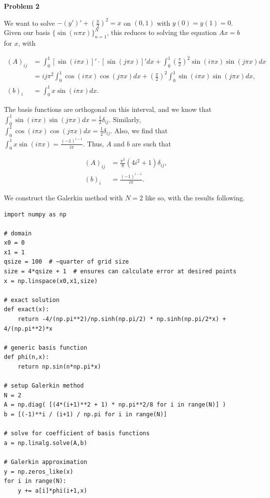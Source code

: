 \documentclass[12pt]{article}
\renewcommand{\d}{\delta}
\begin{document}
\newpage

\textbf{Problem 2}

We want to solve $-(y')' + (\frac{\pi}{2})^2 = x$ on $(0,1)$ with $y(0) = y(1) = 0$. Given our basis $\{\sin(n\pi x)\}_{n=1}^N$, this reduces to solving the equation $Ax = b$ for $x$, with 

\begin{align*}
(A)_{ij} &= \int_0^1 [\sin(i\pi x)]'\cdot[\sin(j\pi x)]'dx + \int_0^1 \left(\frac{\pi}{2}\right)^2 \sin(i\pi x) \sin(j\pi x) dx \\
&= ij\pi^2 \int_0^1 \cos(i\pi x) \cos(j\pi x)dx + \left(\frac{\pi}{2}\right)^2 \int_0^1 \sin(i\pi x) \sin(j\pi x) dx, \\
(b)_i &= \int_0^1 x\sin(i\pi x) dx.
\end{align*}

The basis functions are orthogonal on this interval, and we know that $\int_0^1 \sin(i\pi x) \sin(j\pi x) dx = \frac{1}{2} \d_{ij}$. Similarly, $\int_0^1 \cos(i\pi x) \cos(j\pi x) dx = \frac{1}{2} \d_{ij}$. Also, we find that $\int_0^1 x\sin(i\pi x) = \frac{(-1)^{i-1}}{i\pi}$. Thus, $A$ and $b$ are such that

\begin{align*}
(A)_{ij} &= \frac{\pi^2}{8}(4i^2 + 1)\d_{ij}, \\
(b)_i &= \frac{(-1)^{i-1}}{i\pi}.
\end{align*}

We construct the Galerkin method with $N=2$ like so, with the results following.

\begin{verbatim}
import numpy as np

# domain
x0 = 0
x1 = 1
qsize = 100  # ~quarter of grid size
size = 4*qsize + 1  # ensures can calculate error at desired points
x = np.linspace(x0,x1,size)

# exact solution
def exact(x):
    return -4/(np.pi**2)/np.sinh(np.pi/2) * np.sinh(np.pi/2*x) + 4/(np.pi**2)*x

# generic basis function
def phi(n,x):
    return np.sin(n*np.pi*x)

# setup Galerkin method
N = 2
A = np.diag( [(4*(i+1)**2 + 1) * np.pi**2/8 for i in range(N)] )
b = [(-1)**i / (i+1) / np.pi for i in range(N)]

# solve for coefficient of basis functions
a = np.linalg.solve(A,b)

# Galerkin approximation
y = np.zeros_like(x)
for i in range(N):
    y += a[i]*phi(i+1,x)
\end{verbatim}
\end{document}
